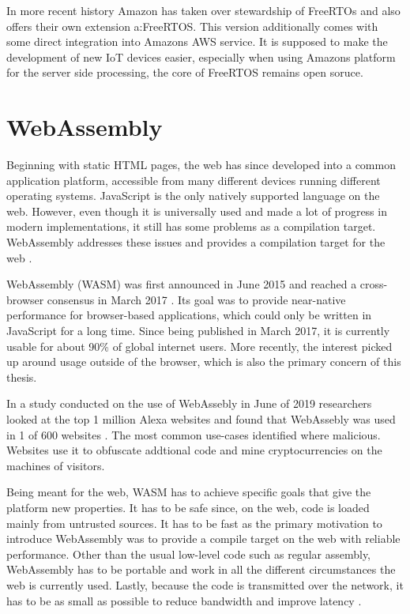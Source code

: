 In more recent history Amazon has taken over stewardship of FreeRTOs and also offers their own extension a:FreeRTOS\autocite{lardinois_amazon_nodate}. This version additionally comes with some direct integration into Amazons AWS service\autocite{noauthor_freertos_nodate-1}. It is supposed to make the development of new IoT devices easier, especially when using Amazons platform for the server side processing, the core of FreeRTOS remains open soruce.

\section{WebAssembly}\label{sec:b_wasm}

Beginning with static HTML pages, the web has since developed into a common application platform, accessible from many different devices running different operating systems. JavaScript is the only natively supported language on the web. However, even though it is universally used and made a lot of progress in modern implementations, it still has some problems as a compilation target. WebAssembly addresses these issues and provides a compilation target for the web \autocite{mdn_contributors_webassembly_nodate}.

WebAssembly (WASM) was first announced in June 2015 \autocite{wagner_webassembly_2015} and reached a cross-browser consensus in March 2017 \autocite{wagner_webassembly_2017-1}. Its goal was to provide near-native performance for browser-based applications, which could only be written in JavaScript for a long time. Since being published in March 2017, it is currently usable for about 90\% of global internet users. More recently, the interest picked up around usage outside of the browser, which is also the primary concern of this thesis.

In a study conducted on the use of WebAssebly in June of 2019 researchers looked at the top 1 million Alexa websites and found that WebAssebly was used in 1 of 600 websites \autocite{musch_new_2019}. The most common use-cases identified where malicious. Websites use it to obfuscate addtional code and mine cryptocurrencies on the machines of visitors.

Being meant for the web, WASM has to achieve specific goals that give the platform new properties. It has to be safe since, on the web, code is loaded mainly from untrusted sources. It has to be fast as the primary motivation to introduce WebAssembly was to provide a compile target on the web with reliable performance. Other than the usual low-level code such as regular assembly, WebAssembly has to be portable and work in all the different circumstances the web is currently used. Lastly, because the code is transmitted over the network, it has to be as small as possible to reduce bandwidth and improve latency \autocite{rossberg_bringing_2018}.

